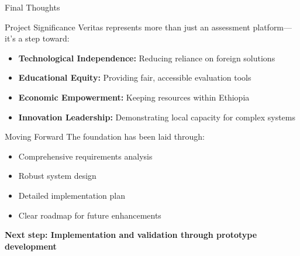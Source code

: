 \begin{frame}{Final Thoughts}
    \begin{block}{Project Significance}
        Veritas represents more than just an assessment platform—it's a step toward:
        \begin{itemize}
            \item \textbf{Technological Independence:} Reducing reliance on foreign solutions
            \item \textbf{Educational Equity:} Providing fair, accessible evaluation tools
            \item \textbf{Economic Empowerment:} Keeping resources within Ethiopia
            \item \textbf{Innovation Leadership:} Demonstrating local capacity for complex systems
        \end{itemize}
    \end{block}
    
    \begin{block}{Moving Forward}
        The foundation has been laid through:
        \begin{itemize}
            \item Comprehensive requirements analysis
            \item Robust system design
            \item Detailed implementation plan
            \item Clear roadmap for future enhancements
        \end{itemize}
    \end{block}
    
    \vspace{0.3cm}
    \begin{center}
        \textbf{Next step: Implementation and validation through prototype development}
    \end{center}
\end{frame}

